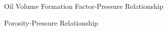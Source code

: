 \documentclass[12pt,letterpaper,titlepage]{article}
\begin{document}
\begin{figure}[p]
\centering
{}
\caption{\label{Bw}Oil Volume Formation Factor-Pressure Relationship}
\end{figure}
\begin{figure}[p]
\centering
{}
\caption{\label{phi}Porosity-Pressure Relationship}
\end{figure}
\end{document}
